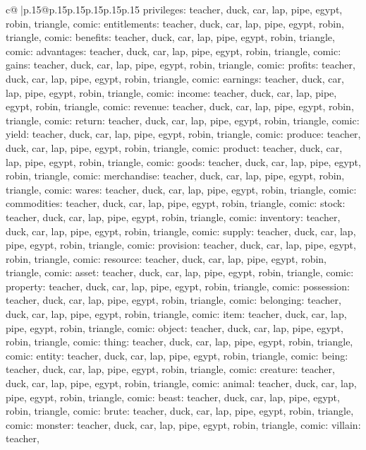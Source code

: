 \documentclass{article}
\begin{document}
{\begin{supertabular}{c@{$\;$}|p{.15\linewidth}@{}p{.15\linewidth}p{.15\linewidth}p{.15\linewidth}p{.15\linewidth}p{.15\linewidth}}
{{{privileges\nTARGETS: teacher, duck, car, lap, pipe, egypt, robin, triangle, comic\n\nCLUE: entitlements\nTARGETS: teacher, duck, car, lap, pipe, egypt, robin, triangle, comic\n\nCLUE: benefits\nTARGETS: teacher, duck, car, lap, pipe, egypt, robin, triangle, comic\n\nCLUE: advantages\nTARGETS: teacher, duck, car, lap, pipe, egypt, robin, triangle, comic\n\nCLUE: gains\nTARGETS: teacher, duck, car, lap, pipe, egypt, robin, triangle, comic\n\nCLUE: profits\nTARGETS: teacher, duck, car, lap, pipe, egypt, robin, triangle, comic\n\nCLUE: earnings\nTARGETS: teacher, duck, car, lap, pipe, egypt, robin, triangle, comic\n\nCLUE: income\nTARGETS: teacher, duck, car, lap, pipe, egypt, robin, triangle, comic\n\nCLUE: revenue\nTARGETS: teacher, duck, car, lap, pipe, egypt, robin, triangle, comic\n\nCLUE: return\nTARGETS: teacher, duck, car, lap, pipe, egypt, robin, triangle, comic\n\nCLUE: yield\nTARGETS: teacher, duck, car, lap, pipe, egypt, robin, triangle, comic\n\nCLUE: produce\nTARGETS: teacher, duck, car, lap, pipe, egypt, robin, triangle, comic\n\nCLUE: product\nTARGETS: teacher, duck, car, lap, pipe, egypt, robin, triangle, comic\n\nCLUE: goods\nTARGETS: teacher, duck, car, lap, pipe, egypt, robin, triangle, comic\n\nCLUE: merchandise\nTARGETS: teacher, duck, car, lap, pipe, egypt, robin, triangle, comic\n\nCLUE: wares\nTARGETS: teacher, duck, car, lap, pipe, egypt, robin, triangle, comic\n\nCLUE: commodities\nTARGETS: teacher, duck, car, lap, pipe, egypt, robin, triangle, comic\n\nCLUE: stock\nTARGETS: teacher, duck, car, lap, pipe, egypt, robin, triangle, comic\n\nCLUE: inventory\nTARGETS: teacher, duck, car, lap, pipe, egypt, robin, triangle, comic\n\nCLUE: supply\nTARGETS: teacher, duck, car, lap, pipe, egypt, robin, triangle, comic\n\nCLUE: provision\nTARGETS: teacher, duck, car, lap, pipe, egypt, robin, triangle, comic\n\nCLUE: resource\nTARGETS: teacher, duck, car, lap, pipe, egypt, robin, triangle, comic\n\nCLUE: asset\nTARGETS: teacher, duck, car, lap, pipe, egypt, robin, triangle, comic\n\nCLUE: property\nTARGETS: teacher, duck, car, lap, pipe, egypt, robin, triangle, comic\n\nCLUE: possession\nTARGETS: teacher, duck, car, lap, pipe, egypt, robin, triangle, comic\n\nCLUE: belonging\nTARGETS: teacher, duck, car, lap, pipe, egypt, robin, triangle, comic\n\nCLUE: item\nTARGETS: teacher, duck, car, lap, pipe, egypt, robin, triangle, comic\n\nCLUE: object\nTARGETS: teacher, duck, car, lap, pipe, egypt, robin, triangle, comic\n\nCLUE: thing\nTARGETS: teacher, duck, car, lap, pipe, egypt, robin, triangle, comic\n\nCLUE: entity\nTARGETS: teacher, duck, car, lap, pipe, egypt, robin, triangle, comic\n\nCLUE: being\nTARGETS: teacher, duck, car, lap, pipe, egypt, robin, triangle, comic\n\nCLUE: creature\nTARGETS: teacher, duck, car, lap, pipe, egypt, robin, triangle, comic\n\nCLUE: animal\nTARGETS: teacher, duck, car, lap, pipe, egypt, robin, triangle, comic\n\nCLUE: beast\nTARGETS: teacher, duck, car, lap, pipe, egypt, robin, triangle, comic\n\nCLUE: brute\nTARGETS: teacher, duck, car, lap, pipe, egypt, robin, triangle, comic\n\nCLUE: monster\nTARGETS: teacher, duck, car, lap, pipe, egypt, robin, triangle, comic\n\nCLUE: villain\nTARGETS: teacher, }}}
\end{supertabular}}
\end{document}
